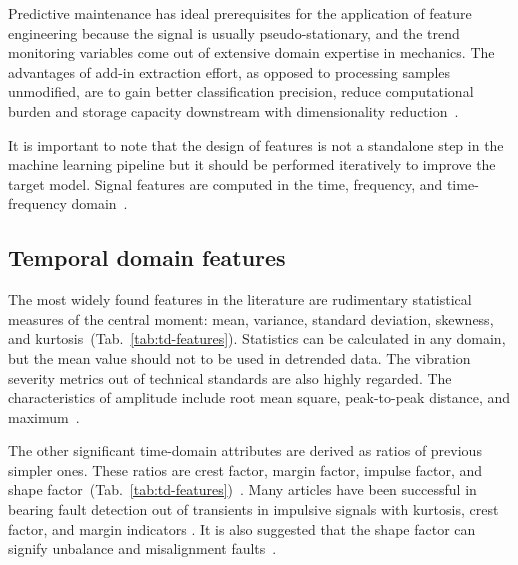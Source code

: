 Predictive maintenance has ideal prerequisites for the application of feature engineering because the signal is usually pseudo-stationary, and the trend monitoring variables come out of extensive domain expertise in mechanics. The advantages of add-in extraction effort, as opposed to processing samples unmodified, are to gain better classification precision, reduce computational burden and storage capacity downstream with dimensionality reduction~\cite{johnson_feature_2019}. 

It is important to note that the design of features is not a standalone step in the machine learning pipeline but it should be performed iteratively to improve the target model. Signal features are computed in the time, frequency, and time-frequency domain~\cite{brito_fault_2021}.

\subsection{Temporal domain features}
The most widely found features in the literature are rudimentary statistical measures of the central moment: mean, variance, standard deviation, skewness, and kurtosis~(Tab.~\ref{tab:td-features}). Statistics can be calculated in any domain, but the mean value should not to be used in detrended data. The vibration severity metrics out of technical standards are also highly regarded. The characteristics of amplitude include root mean square, peak-to-peak distance, and maximum~\cite{mostafavi_novel_2021}.

The other significant time-domain attributes are derived as ratios of previous simpler ones. These ratios are crest factor, margin factor, impulse factor, and shape factor~(Tab.~\ref{tab:td-features})~\cite{nandi_condition_2019}. Many articles have been successful in bearing fault detection out of transients in impulsive signals with kurtosis, crest factor, and margin indicators \cite{brito_fault_2021}. It is also suggested that the shape factor can signify unbalance and misalignment faults~\cite{nandi_condition_2019}.

